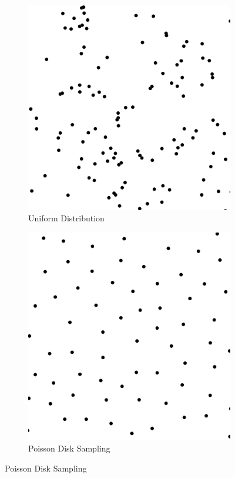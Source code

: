 \documentclass[a4paper,11pt]{article}
\begin{document}
\begin{figure}[htp]
\centering
\begin{subfigure}[t]{0.6\textwidth}
  \centering
  \includegraphics[width=\textwidth]{ch3_figs/uniform_cloud_edited}
  \caption{Uniform Distribution}
  \label{fig:penrose_types:kd}
\end{subfigure}

\begin{subfigure}[t]{0.6\textwidth}
  \centering
  \includegraphics[width=\textwidth]{ch3_figs/poisson_cloud_edited}
  \caption{Poisson Disk Sampling}
  \label{fig:penrose_types:tt}
\end{subfigure}


\end{figure}
\end{document}
